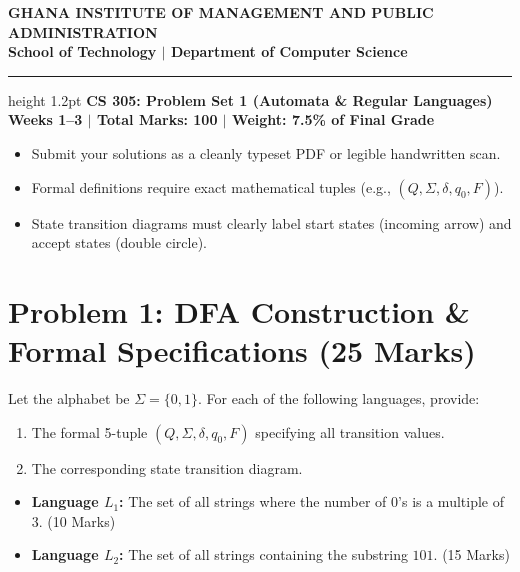 \documentclass[11pt,a4paper]{article}
\begin{document}
\begin{center}
    {\Large \textbf{\color{gimpanavy}GHANA INSTITUTE OF MANAGEMENT AND PUBLIC ADMINISTRATION}}\\
    {\large \textbf{\color{gimpaaccent}School of Technology $|$ Department of Computer Science}}\\
    \vspace{4pt}
    \hrule height 1.2pt \color{gimpanavy}
    \vspace{6pt}
    {\LARGE \textbf{\color{gimpanavy}CS 305: Problem Set 1 (Automata \& Regular Languages)}}\\
    {\large \textbf{Weeks 1--3 $|$ Total Marks: 100 $|$ Weight: 7.5\% of Final Grade}}
\end{center}

\vspace{6pt}

\begin{tcolorbox}[colback=gimpalight, colframe=gimpanavy, title=\textbf{Instructions \& Guidelines}]
\begin{itemize}[leftmargin=1.2em, itemsep=2pt]
    \item Submit your solutions as a cleanly typeset PDF or legible handwritten scan.
    \item Formal definitions require exact mathematical tuples (e.g., $(Q, \Sigma, \delta, q_0, F)$).
    \item State transition diagrams must clearly label start states (incoming arrow) and accept states (double circle).
\end{itemize}
\end{tcolorbox}

\vspace{8pt}

\section*{Problem 1: DFA Construction \& Formal Specifications (25 Marks)}
Let the alphabet be $\Sigma = \{0, 1\}$. For each of the following languages, provide:
\begin{enumerate}[label=\textbf{(\alph*)}]
    \item The formal 5-tuple $(Q, \Sigma, \delta, q_0, F)$ specifying all transition values.
    \item The corresponding state transition diagram.
\end{enumerate}
\begin{itemize}
    \item \textbf{Language $L_1$:} The set of all strings where the number of $0$'s is a multiple of 3. (10 Marks)
    \item \textbf{Language $L_2$:} The set of all strings containing the substring $101$. (15 Marks)
\end{itemize}
\end{document}
